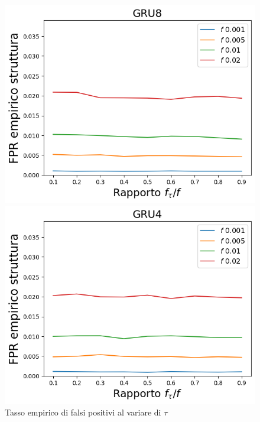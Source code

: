 \documentclass{beamer}
\begin{document}
\begin{frame}
\begin{figure}[htbp]
    \hfill
    \begin{minipage}{0.25\textwidth}
    \centering
    \includegraphics[width=\textwidth]{immagini/7/LBF/GRU8_FPR.png}
    \end{minipage}%
    \hfill
    \begin{minipage}{0.25\textwidth}
    \centering
    \includegraphics[width=\textwidth]{immagini/7/LBF/GRU4_FPR.png}
    \end{minipage}%
    \hfill

    \begin{minipage}[t]{\textwidth}
    \centering
    \caption{Tasso empirico di falsi positivi al variare di $\tau$}
    \end{minipage}%


\end{figure}
\end{frame}
\end{document}
